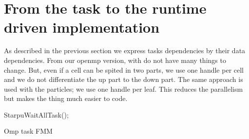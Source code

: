 \documentclass[12pt,letterpaper,titlepage]{report}
\begin{document}
\section{From the task to the runtime driven implementation}
As described in the previous section we express tasks dependencies by their data dependencies.
From our openmp version, with do not have many things to change.
But, even if a cell can be spited in two parts, we use one handle per cell and we do not differentiate the up part to the down part.
The same approach is used with the particles; we use one handle per leaf.
This reduces the parallelism but makes the thing much easier to code.
\BlankLine
\begin{algorithm}[H]
\linesnumbered
\SetLine
\BlankLine
{}
\BlankLine
{}
\BlankLine
{}
\BlankLine
StarpuWaitAllTask();
\BlankLine
\caption{Omp task FMM}
\end{algorithm}
\BlankLine
\end{document}
